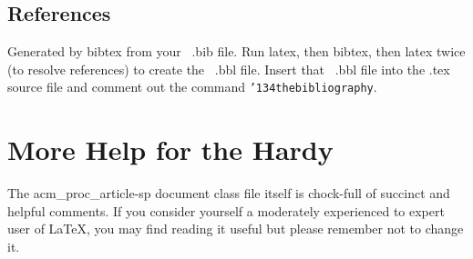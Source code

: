 \documentclass{acm_proc_article-sp}
\begin{document}
\subsection{References}
Generated by bibtex from your ~.bib file.  Run latex,
then bibtex, then latex twice (to resolve references)
to create the ~.bbl file.  Insert that ~.bbl file into
the .tex source file and comment out
the command \texttt{{\char'134}thebibliography}.
\section{More Help for the Hardy}
The acm\_proc\_article-sp document class file itself is chock-full of succinct
and helpful comments.  If you consider yourself a moderately
experienced to expert user of \LaTeX, you may find reading
it useful but please remember not to change it.
\balancecolumns
\end{document}
